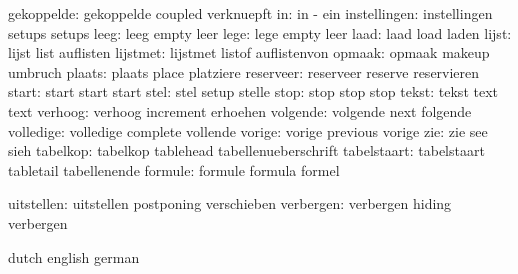          gekoppelde:  gekoppelde           coupled             verknuepft
                 in:  in                   -                   ein
       instellingen:  instellingen         setups              setups %
               leeg:  leeg                 empty               leer
               lege:  lege                 empty               leer
               laad:  laad                 load                laden
              lijst:  lijst                list                auflisten
           lijstmet:  lijstmet             listof              auflistenvon
             opmaak:  opmaak               makeup              umbruch
             plaats:  plaats               place               platziere
          reserveer:  reserveer            reserve             reservieren
              start:  start                start               start
               stel:  stel                 setup               stelle
               stop:  stop                 stop                stop
              tekst:  tekst                text                text
            verhoog:  verhoog              increment           erhoehen
           volgende:  volgende             next                folgende
          volledige:  volledige            complete            vollende
             vorige:  vorige               previous            vorige
                zie:  zie                  see                 sieh
           tabelkop:  tabelkop             tablehead           tabellenueberschrift
        tabelstaart:  tabelstaart          tabletail           tabellenende
            formule:  formule              formula             formel

         uitstellen:  uitstellen           postponing          verschieben
          verbergen:  verbergen            hiding              verbergen

\stopelements




\startvariables      dutch             english              german

